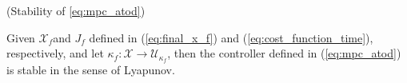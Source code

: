 




\begin{proposition}{(Stability of \ref{eq:mpc_atod})}

	Given $\mathcal{X}_f$and $J_f$ defined in (\ref{eq:final_x_f}) and (\ref{eq:cost_function_time}), respectively, and let $\kappa_f:\mathcal{X}\rightarrow\mathcal{U}_{\kappa_f}$,  then the controller defined in (\ref{eq:mpc_atod}) is stable in the sense of Lyapunov.
\end{proposition}\\

